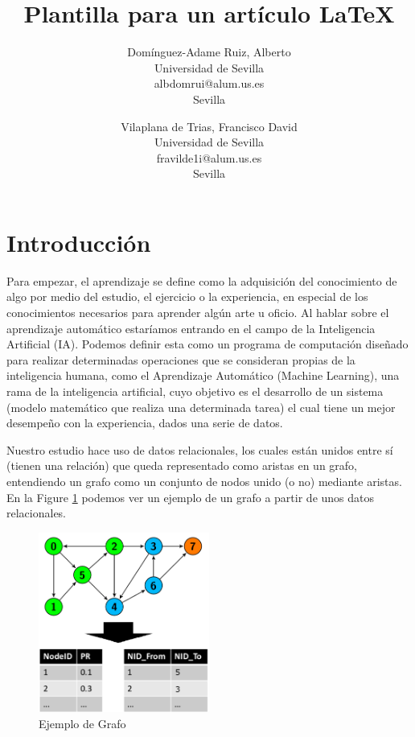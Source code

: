 \documentclass[12pt]{article}
\title{Plantilla para un artículo \LaTeX}
\author{
  Domínguez-Adame Ruiz, Alberto\\
  \small Universidad de Sevilla\\
  \small albdomrui@alum.us.es\\
  \small Sevilla
  \date{}
  \and
 Vilaplana de Trias, Francisco David\\
  \small Universidad de Sevilla\\
  \small fravilde1i@alum.us.es\\
  \small Sevilla
  \date{}
}
\newcommand\tab[1][1cm]{\hspace*{#1}}
\begin{document}


\maketitle







\section{Introducci\'on}


\tab[0,65cm]Para empezar, el aprendizaje se define como la adquisición del conocimiento de algo por medio del estudio, el ejercicio o la experiencia, en especial de los conocimientos necesarios para aprender algún arte u oficio. Al hablar sobre el aprendizaje automático estaríamos entrando en el campo de la Inteligencia Artificial (IA). Podemos definir esta como un programa de computación diseñado para realizar determinadas operaciones que se consideran propias de la inteligencia humana, como el Aprendizaje Automático (Machine Learning), una rama de la inteligencia artificial, cuyo objetivo es el desarrollo de un sistema (modelo matemático que realiza una determinada tarea)  el cual tiene un mejor desempeño con la experiencia, dados una serie de datos.

Nuestro estudio hace uso de datos relacionales, los cuales están unidos entre sí (tienen una relación) que queda representado como aristas en un grafo, entendiendo un grafo como un conjunto de nodos unido (o no) mediante aristas. En la Figure \ref{fig:tablaEj} podemos ver un ejemplo de un grafo a partir de unos datos relacionales. 

\begin{figure} %
    \centering
    \includegraphics[width=0.5\textwidth]{./ImagenesMemoria/TablaEjemplo}
    \caption{\label{fig:tablaEj}Ejemplo de Grafo}
\end{figure}
\end{document}
